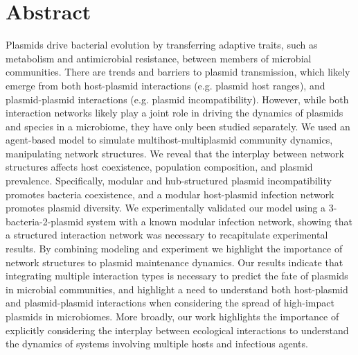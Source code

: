 \documentclass[10pt,letterpaper]{article}
\begin{document}
\section*{Abstract}
Plasmids drive bacterial evolution by transferring adaptive traits, such as metabolism and antimicrobial resistance, between members of microbial communities. There are trends and barriers to plasmid transmission, which likely emerge from both host-plasmid interactions (e.g. plasmid host ranges), and plasmid-plasmid interactions (e.g. plasmid incompatibility). However, while both interaction networks likely play a joint role in driving the dynamics of plasmids and species in a microbiome, they have only been studied separately. We used an agent-based model to simulate multihost-multiplasmid community dynamics, manipulating network structures. We reveal that the interplay between network structures affects host coexistence, population composition, and plasmid prevalence. Specifically, modular and hub-structured plasmid incompatibility promotes bacteria coexistence, and a modular host-plasmid infection network promotes plasmid diversity. We experimentally validated our model using a 3-bacteria-2-plasmid system with a known modular infection network, showing that a structured interaction network was necessary to recapitulate experimental results. By combining modeling and experiment we highlight the importance of network structures to plasmid maintenance dynamics. Our results indicate that integrating multiple interaction types is necessary to predict the fate of plasmids in microbial communities, and highlight a need to understand both host-plasmid and plasmid-plasmid interactions when considering the spread of high-impact plasmids in microbiomes. More broadly, our work highlights the importance of explicitly considering the interplay between ecological interactions to understand the dynamics of systems involving multiple hosts and infectious agents.


\end{document}
